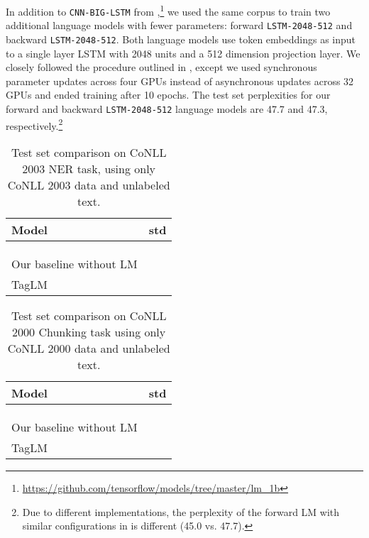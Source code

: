 \documentclass[11pt,a4paper]{article}
\begin{document}
In addition to \texttt{CNN-BIG-LSTM} from \citet{Jzefowicz2016ExploringTL},\footnote{\url{https://github.com/tensorflow/models/tree/master/lm_1b}} we used the same corpus to train two additional language models with fewer parameters: forward \texttt{LSTM-2048-512} and backward \texttt{LSTM-2048-512}.
Both language models use token embeddings as input to
a single layer LSTM with 2048 units and a 512 dimension projection layer.  
We closely followed the procedure outlined in \citet{Jzefowicz2016ExploringTL}, except we used synchronous parameter updates across four GPUs instead of asynchronous updates across 32 GPUs and ended training after 10 epochs.
The test set perplexities for our forward and backward \texttt{LSTM-2048-512} language models are 47.7 and 47.3, respectively.\footnote{Due to different implementations, the perplexity of the forward LM with similar configurations in \citet{Jzefowicz2016ExploringTL} is different (45.0 vs. 47.7).}

\begin{table}[t]
\begin{center}
\begin{tabular}{l|l}
\hline \hline
\bf Model & \bf  std \\ \hline
\citet{chiu-nichols-2016} &  \\
\citet{lample-EtAl:2016:N16-1} &  \\
\citet{Ma2016EndtoendSL} &  \\
\hline
Our baseline without LM   &   \\
TagLM &  \\
\hline \hline
\end{tabular}
\end{center}
\caption{\label{2003-table} Test set  comparison on CoNLL 2003 NER task,
using only CoNLL 2003 data and unlabeled text.}
\end{table}



\begin{table}[t]
\begin{center}
\begin{tabular}{l|l}
\hline \hline
\bf Model & \bf  std \\ \hline
\citet{yang-transfer-iclr07} &  \\
\citet{joint-many-iclr07} &  \\
\citet{Sgaard2016DeepML} &  \\
\hline
Our baseline without LM   &   \\
TagLM &  \\
\hline \hline
\end{tabular}
\end{center}
\caption{\label{2000-table} Test set  comparison on CoNLL 2000 Chunking task using only CoNLL 2000 data and unlabeled text.}
\end{table}
\end{document}
